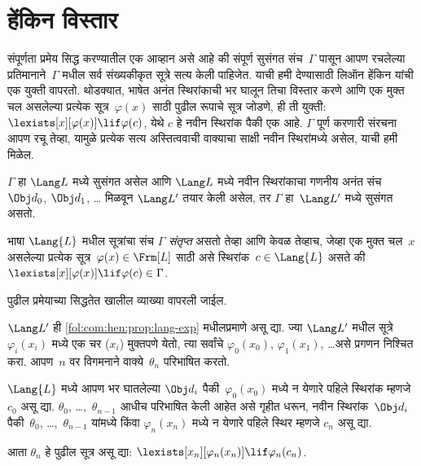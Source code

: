 \section{हेंकिन विस्तार}\label{fol:com:hen:sec}

\begin{explain}
संपूर्णता प्रमेय सिद्ध करण्यातील एक आव्हान असे आहे की संपूर्ण सुसंगत
संच~$\Gamma$ पासून आपण रचलेल्या प्रतिमानाने~$\Gamma$ मधील सर्व संख्यकीकृत
सूत्रे सत्य केली पाहिजेत. याची हमी देण्यासाठी लिऑन हेंकिन यांची एक
युक्ती वापरतो. थोडक्यात, भाषेत अनंत स्थिरांकाची भर घालून तिचा विस्तार
करणे आणि एक मुक्त चल असलेल्या प्रत्येक सूत्र~$\varphi(x)$ साठी
पुढील रूपाचे सूत्र जोडणे, ही ती युक्ती:
$\lexists[x][\varphi(x)] \lif \varphi(c)$,
येथे $c$ हे नवीन स्थिरांक पैकी एक आहे. $\Gamma$ पूर्ण करणारी
संरचना आपण रचू तेव्हा, यामुळे प्रत्येक
सत्य अस्तित्ववाची वाक्याचा साक्षी
नवीन स्थिरांमध्ये असेल, याची हमी मिळेल.
\end{explain}

\begin{prop}
\label{fol:com:hen:prop:lang-exp}
$\Gamma$ हा $\Lang L$ मध्ये सुसंगत असेल आणि $\Lang L$ मध्ये नवीन
स्थिरांकाचा गणनीय अनंत संच $\Obj d_0$, $\Obj d_1$, \dots
मिळवून $\Lang L'$ तयार केली असेल, तर $\Gamma$ हा~$\Lang L'$ मध्ये
सुसंगत असतो.
\end{prop}

\begin{defn}[संतृप्त संच]
भाषा $\Lang {L}$ मधील सूत्रांचा संच $\Gamma$
\emph{संतृप्त} असतो तेव्हा आणि केवळ तेव्हाच, जेव्हा एक मुक्त
चल~$x$ असलेल्या प्रत्येक सूत्र~$\varphi(x) \in \Frm[L]$
साठी असे स्थिरांक~$c \in \Lang{L}$ असते की
$\lexists[x][\varphi(x)] \lif \varphi(c) \in \Gamma$.
\end{defn}

पुढील प्रमेयाच्या सिद्धतेत खालील व्याख्या वापरली जाईल.

\begin{defn}
\label{fol:com:hen:defn:henkin-exp}
$\Lang L'$ ही \ref{fol:com:hen:prop:lang-exp} मधीलप्रमाणे असू द्या. ज्या
$\Lang L'$ मधील सूत्रे~$\varphi_i(x_i)$ मध्ये एक चर ($x_i$) मुक्तपणे
येतो, त्या सर्वांचे $\varphi_0(x_0)$, $\varphi_1(x_1)$, \dots असे प्रगणन निश्चित
करा. आपण~$n$ वर विगमनाने वाक्ये~$\theta_n$ परिभाषित करतो.

$\Lang{L}$ मध्ये आपण भर घातलेल्या $\Obj d_i$ पैकी~$\varphi_0(x_0)$ मध्ये
न येणारे पहिले स्थिरांक म्हणजे $c_0$ असू द्या. $\theta_0$,
\dots,~$\theta_{n-1}$ आधीच परिभाषित केली आहेत असे गृहीत धरून, नवीन
स्थिरांक~$\Obj d_i$ पैकी~$\theta_0$, \dots,~$\theta_{n-1}$ यांमध्ये किंवा
$\varphi_n(x_n)$ मध्ये न येणारे पहिले स्थिर म्हणजे $c_n$ असू द्या.

आता $\theta_{n}$ हे पुढील सूत्र असू द्या:
$\lexists[x_{n}][\varphi_{n}(x_{n})] \lif
  \varphi_{n}(c_{n})$.
\end{defn}

